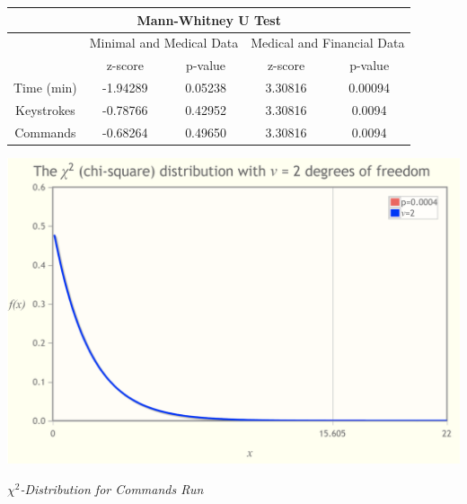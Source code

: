 \documentclass[12pt]{article}
\begin{document}
\begin{table}[h!]
\begin{center}
\begin{tabular}{|ccccc|}
\hline
\multicolumn{5}{|c|}{Mann-Whitney U Test}                                                                                                                \\ \hline
\multicolumn{1}{|c|}{\multirow{2}{*}{}} & \multicolumn{2}{c|}{Minimal and Medical Data}                & \multicolumn{2}{c|}{Medical and Financial Data} \\ \cline{2-5} 
\multicolumn{1}{|c|}{}                  & \multicolumn{1}{c|}{z-score}  & \multicolumn{1}{c|}{p-value} & \multicolumn{1}{c|}{z-score}      & p-value     \\ \hline
\multicolumn{1}{|c|}{Time (min)}        & \multicolumn{1}{c|}{-1.94289} & \multicolumn{1}{c|}{0.05238} & \multicolumn{1}{c|}{3.30816}      & 0.00094     \\ \hline
\multicolumn{1}{|c|}{Keystrokes}        & \multicolumn{1}{c|}{-0.78766} & \multicolumn{1}{c|}{0.42952} & \multicolumn{1}{c|}{3.30816}      & 0.0094      \\ \hline
\multicolumn{1}{|c|}{Commands}          & \multicolumn{1}{c|}{-0.68264} & \multicolumn{1}{c|}{0.49650} & \multicolumn{1}{c|}{3.30816}      & 0.0094      \\ \hline
\end{tabular}
\end{center}
\end{table}

\begin{center} \includegraphics[scale=0.3]{./chi-square.png} \end{center}
\begin{center} \textit{$\chi^2$-Distribution for Commands Run} \end{center}
\end{document}
